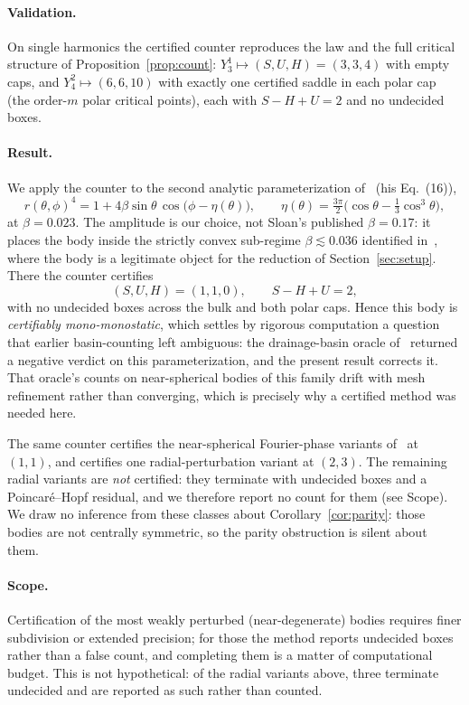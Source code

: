 \documentclass[11pt,a4paper]{article}
\theoremstyle{definition}
\begin{document}
\paragraph{Validation.} On single harmonics the certified counter reproduces the law and the full critical
structure of Proposition~\ref{prop:count}: $Y_3^1\mapsto(S,U,H)=(3,3,4)$ with empty caps, and $Y_4^2\mapsto
(6,6,10)$ with exactly one certified saddle in each polar cap (the order-$m$ polar critical points), each with
$S-H+U=2$ and no undecided boxes.

\paragraph{Result.} We apply the counter to the second analytic parameterization of~\cite{sloan2023} (his
Eq.~(16)),
\[
r(\theta,\phi)^4 = 1 + 4\beta\sin\theta\,\cos\!\big(\phi-\eta(\theta)\big), \qquad
\eta(\theta)=\tfrac{3\pi}{2}\big(\cos\theta-\tfrac13\cos^3\theta\big),
\]
at $\beta=0.023$. The amplitude is our choice, not Sloan's published $\beta=0.17$: it places the body inside
the strictly convex sub-regime $\beta\lesssim0.036$ identified in~\cite{couey2026sloan}, where the body is a
legitimate object for the reduction of Section~\ref{sec:setup}. There the counter certifies
\[
(S,U,H) = (1,1,0), \qquad S-H+U=2,
\]
with no undecided boxes across the bulk and both polar caps. Hence this body is \emph{certifiably
mono-monostatic}, which settles by rigorous computation a question that earlier basin-counting left ambiguous:
the drainage-basin oracle of~\cite{couey2026mono} returned a negative verdict on this parameterization, and the
present result corrects it. That oracle's counts on near-spherical bodies of this family drift with mesh
refinement rather than converging, which is precisely why a certified method was needed here.

The same counter certifies the near-spherical Fourier-phase variants of~\cite{couey2026mono} at $(1,1)$, and
certifies one radial-perturbation variant at $(2,3)$. The remaining radial variants are \emph{not} certified:
they terminate with undecided boxes and a Poincar\'e--Hopf residual, and we therefore report no count for them
(see Scope). We draw no inference from these classes about Corollary~\ref{cor:parity}: those bodies are not
centrally symmetric, so the parity obstruction is silent about them.

\paragraph{Scope.} Certification of the most weakly perturbed (near-degenerate) bodies requires finer
subdivision or extended precision; for those the method reports undecided boxes rather than a false count, and
completing them is a matter of computational budget. This is not hypothetical: of the radial variants above,
three terminate undecided and are reported as such rather than counted.
\end{document}

